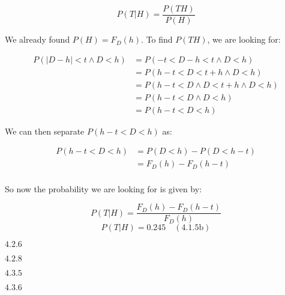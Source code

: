 \documentclass{article}
\newcommand{\problem}[2]{$\boxed{\text{#1.#2}}$}
\newcommand{\subsolution}[4]{\boxed{#4\quad(\text{#1.#2#3})}}
\newcommand{\multistep}[1]{\begin{array}{rl} #1 \end{array}}
\begin{document}
\[
P(T|H)=\frac{P(TH)}{P(H)}
\]

We already found $P(H)=F_D(h)$. To find $P(TH)$, we are looking for:

\[
\multistep{
P(|D-h|<t \wedge D<h)&=P(-t<D-h<t \wedge D<h) \\
&=P(h-t<D<t+h \wedge D<h) \\
&=P(h-t<D \wedge D<t+h\wedge D<h) \\
&=P(h-t<D \wedge D<h) \\
&=P(h-t<D<h)
}
\]

We can then separate $P(h-t<D<h)$ as:

\[
\multistep{
P(h-t<D<h)&=P(D<h)-P(D<h-t) \\
&=F_D(h)-F_D(h-t) \\
}
\]

So now the probability we are looking for is given by:

\[
P(T|H)=\frac{F_D(h)-F_D(h-t)}{F_D(h)}
\] \[
\subsolution{4.1}{5}{b}{P(T|H)=0.245}
\]

%
\problem{4.2}{6}

%
\problem{4.2}{8}

%
\problem{4.3}{5}

%
\problem{4.3}{6}
\end{document}
